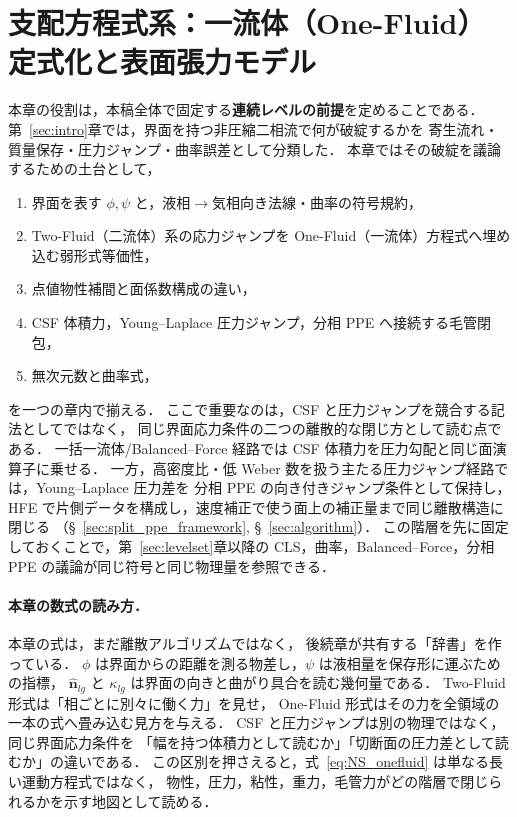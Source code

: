 
\section{支配方程式系：一流体（One-Fluid）定式化と表面張力モデル}
\label{sec:governing}

本章の役割は，本稿全体で固定する\textbf{連続レベルの前提}を定めることである．
第~\ref{sec:intro}章では，界面を持つ非圧縮二相流で何が破綻するかを
寄生流れ・質量保存・圧力ジャンプ・曲率誤差として分類した．
本章ではその破綻を議論するための土台として，
\begin{enumerate}[noitemsep]
  \item 界面を表す $\phi,\psi$ と，液相$\to$気相向き法線・曲率の符号規約，
  \item Two-Fluid（二流体）系の応力ジャンプを One-Fluid（一流体）方程式へ埋め込む弱形式等価性，
  \item 点値物性補間と面係数構成の違い，
  \item CSF 体積力，Young--Laplace 圧力ジャンプ，分相 PPE へ接続する毛管閉包，
  \item 無次元数と曲率式，
\end{enumerate}
を一つの章内で揃える．
ここで重要なのは，CSF と圧力ジャンプを競合する記法としてではなく，
同じ界面応力条件の二つの離散的な閉じ方として読む点である．
一括一流体/Balanced--Force 経路では CSF 体積力を圧力勾配と同じ面演算子に乗せる．
一方，高密度比・低 Weber 数を扱う主たる圧力ジャンプ経路では，Young--Laplace 圧力差を
分相 PPE の向き付きジャンプ条件として保持し，
HFE で片側データを構成し，速度補正で使う面上の補正量まで同じ離散構造に閉じる
（§~\ref{sec:split_ppe_framework}, §~\ref{sec:algorithm}）．
この階層を先に固定しておくことで，第~\ref{sec:levelset}章以降の
CLS，曲率，Balanced--Force，分相 PPE の議論が同じ符号と同じ物理量を参照できる．

\paragraph{本章の数式の読み方．}
本章の式は，まだ離散アルゴリズムではなく，
後続章が共有する「辞書」を作っている．
$\phi$ は界面からの距離を測る物差し，$\psi$ は液相量を保存形に運ぶための指標，
$\hat{\bm n}_{lg}$ と $\kappa_{lg}$ は界面の向きと曲がり具合を読む幾何量である．
Two-Fluid 形式は「相ごとに別々に働く力」を見せ，
One-Fluid 形式はその力を全領域の一本の式へ畳み込む見方を与える．
CSF と圧力ジャンプは別の物理ではなく，同じ界面応力条件を
「幅を持つ体積力として読むか」「切断面の圧力差として読むか」の違いである．
この区別を押さえると，式~\eqref{eq:NS_onefluid} は単なる長い運動方程式ではなく，
物性，圧力，粘性，重力，毛管力がどの階層で閉じられるかを示す地図として読める．

